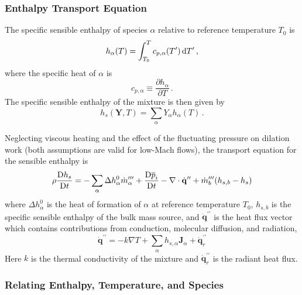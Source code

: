 \documentclass[11pt]{book}
\begin{document}
\subsubsection{Enthalpy Transport Equation}
\label{enthalpy_definitions}

The specific sensible enthalpy of species $\alpha$ relative to reference temperature $T_0$ is
\begin{equation}
\label{eqn_sensible}
h_{\alpha}(T) = \int_{T_0}^{T} c_{p,\alpha}(T^\prime) \,\mathrm{d} T^\prime \,\mbox{,}
\end{equation}
where the specific heat of $\alpha$ is
\begin{equation}
\label{eqn_specificheat}
c_{p,\alpha} \equiv \frac{\partial h_{\alpha}}{\partial T} \,\mbox{.}
\end{equation}
The specific sensible enthalpy of the mixture is then given by
\begin{equation}
\label{eqn_chemsensmix}
h_s(\mathbf{Y},T) = \sum_\alpha Y_\alpha h_{\alpha}(T) \,\mbox{.}
\end{equation}

Neglecting viscous heating and the effect of the fluctuating pressure on dilation work (both assumptions are valid for low-Mach flows), the transport equation for the sensible enthalpy is
\begin{equation}
\label{eqn_enthalpytransport}
\rho \frac{\mbox{D} h_s }{\mbox{D} t} = -\sum_\alpha \Delta h^0_\alpha \dot{m}_{\alpha}^{{\prime\prime\prime}}
+ \frac{\mbox{D} \overline{p}_i }{\mbox{D} t} - \nabla\cdot \dot{\mathbf{q}}^{\prime\prime} + \dot{m}_{b}^{{\prime\prime\prime}} ( h_{s,b} - h_s )
\end{equation}
where $\Delta h^0_\alpha$ is the heat of formation of $\alpha$ at reference temperature $T_0$, $h_{s,b}$ is the specific sensible enthalpy of the bulk mass source,
and $\dot{\mathbf{q}}^{\prime\prime}$ is the heat flux vector which contains contributions from conduction, molecular diffusion, and radiation,
\begin{equation}
\label{eqn_heatflux}
\dot{\mathbf{q}}^{\prime\prime} = -k \nabla T + \sum_\alpha h_{s,\alpha} \mathbf{J}_{\alpha} + \dot{\mathbf{q}}^{\prime\prime}_{r}
\end{equation}
Here $k$ is the thermal conductivity of the mixture and $\dot{\mathbf{q}}^{\prime\prime}_{r}$ is the radiant heat flux.


\subsubsection{Relating Enthalpy, Temperature, and Species}
\label{eqn_enthalpy_temperature}
\end{document}
